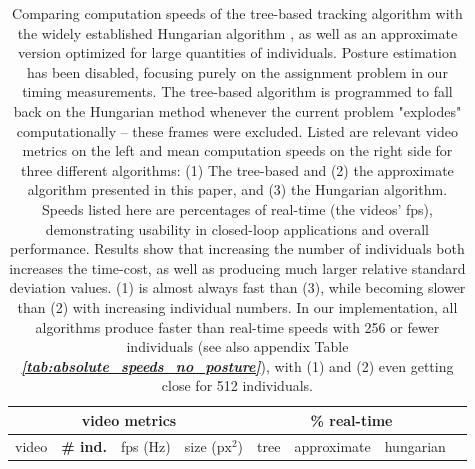 \documentclass[9pt,lineno]{elife}
\newcommand{\tableref}[1]{\textit{\textbf{\ref{tab:#1}}}\xspace}
\begin{document}
\begin{table}[h]
\caption{\label{tab:timings_apprx}Comparing computation speeds of the tree-based tracking algorithm with the widely established Hungarian algorithm \cite{kuhn1955hungarian}, as well as an approximate version optimized for large quantities of individuals. Posture estimation has been disabled, focusing purely on the assignment problem in our timing measurements. The tree-based algorithm is programmed to fall back on the Hungarian method whenever the current problem "explodes" computationally -- these frames were excluded. Listed are relevant video metrics on the left and mean computation speeds on the right side for three different algorithms: (1) The tree-based and (2) the approximate algorithm presented in this paper, and (3) the Hungarian algorithm. Speeds listed here are percentages of real-time (the videos' fps), demonstrating usability in closed-loop applications and overall performance. Results show that increasing the number of individuals both increases the time-cost, as well as producing much larger relative standard deviation values. (1) is almost always fast than (3), while becoming slower than (2) with increasing individual numbers. In our implementation, all algorithms produce faster than real-time speeds with 256 or fewer individuals (see also appendix Table \tableref{absolute_speeds_no_posture}), with (1) and (2) even getting close for 512 individuals.}
\begin{tabular}{l l l l | l l l l}
\toprule
\multicolumn{4}{c|}{video metrics} & \multicolumn{3}{c}{\% real-time} \\
\midrule
video & \textbf{{\# ind.}}  & fps (Hz) & size ($\mathrm{px}^2$) & tree & approximate & hungarian  \\
\midrule


\end{tabular}
\end{table}
\end{document}
